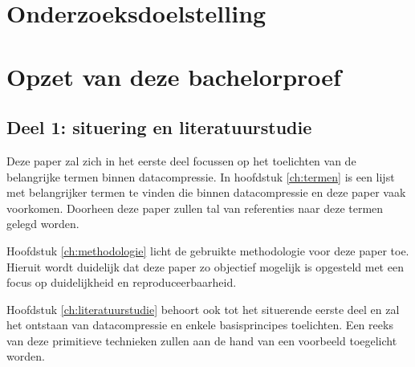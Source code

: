 
\section{Onderzoeksdoelstelling}
\label{sec:onderzoeksdoelstelling}


\section{Opzet van deze bachelorproef}
\label{sec:opzet-bachelorproef}


\subsection{Deel 1: situering en literatuurstudie}
\label{sec:opzet-bachelorproef-deel-1}

Deze paper zal zich in het eerste deel focussen op het toelichten van de belangrijke termen binnen \gls{datacompressie}. In hoofdstuk \ref{ch:termen} is een lijst met belangrijker termen te vinden die binnen \gls{datacompressie} en deze paper vaak voorkomen. Doorheen deze paper zullen tal van referenties naar deze termen gelegd worden. 

Hoofdstuk \ref{ch:methodologie} licht de gebruikte methodologie voor deze paper toe. Hieruit wordt duidelijk dat deze paper zo objectief mogelijk is opgesteld met een focus op duidelijkheid en reproduceerbaarheid.

Hoofdstuk \ref{ch:literatuurstudie} behoort ook tot het situerende eerste deel en zal het ontstaan van \gls{datacompressie} en enkele basisprincipes toelichten. Een reeks van deze primitieve technieken zullen aan de hand van een voorbeeld toegelicht worden.

